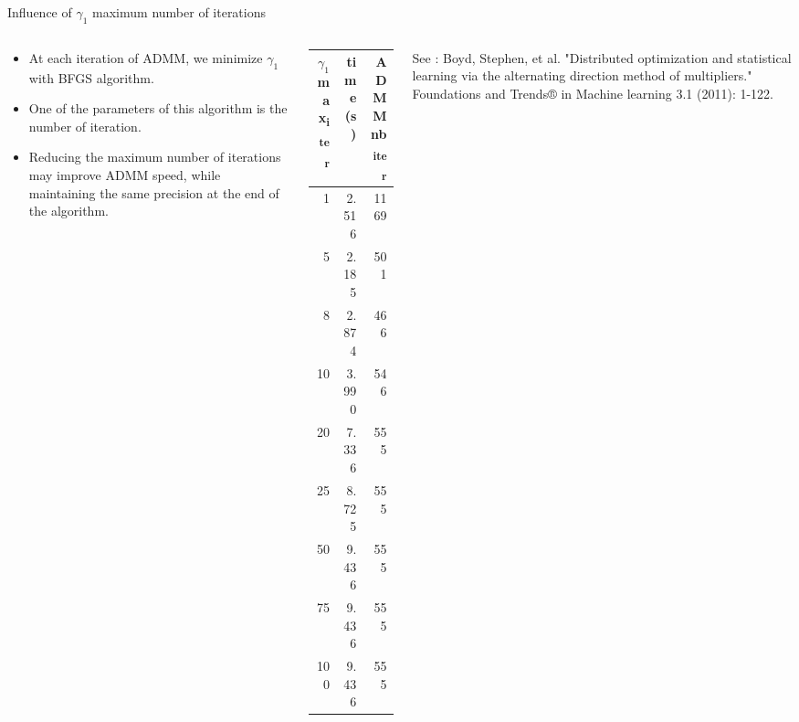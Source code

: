 \documentclass[aspectratio=1610,usenames,dvipsnames]{beamer}
\begin{document}
\begin{frame}{Influence of $\gamma_1$ maximum number of iterations}
\begin{columns}
    \begin{column}{0.48\textwidth}
        
        \begin{itemize}
        \item At each iteration of ADMM, we minimize $\gamma_1$ with BFGS algorithm.
        
        \item One of the parameters of this algorithm is the number of iteration.
        
        \item Reducing the maximum number of iterations may improve ADMM speed, while maintaining the same precision at the end of the algorithm.
        \end{itemize}
        
    \end{column}
        \begin{column}{0.48\textwidth}
        
       \begin{center}
        \begin{tabular}{rrr}
        $\gamma_1$ max\textsubscript{iter} & time (s) & ADMM nb\textsubscript{iter}\\
        \hline
        1 & 2.516 & 1169\\
        5 & 2.185 & 501\\
        8 & 2.874 & 466\\
        10 & 3.990 & 546\\
        20 & 7.336 & 555\\
        25 & 8.725 & 555\\
        50 & 9.436 & 555\\
        75 & 9.436 & 555\\
        100 & 9.436 & 555\\
        \end{tabular}
        \end{center}
        
    \end{column}
    See : Boyd, Stephen, et al. "Distributed optimization and statistical learning via the alternating direction method of multipliers." Foundations and Trends® in Machine learning 3.1 (2011): 1-122.
\end{columns}

    
\end{frame}
\end{document}
